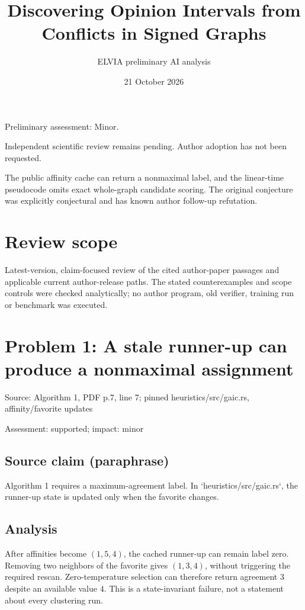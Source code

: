 \documentclass[11pt]{article}
\begin{document}
\title{Discovering Opinion Intervals from Conflicts in Signed Graphs}

\author{ELVIA preliminary AI analysis}\date{21 October 2026}\maketitle

Preliminary assessment: Minor.\par

Independent scientific review remains pending. Author adoption has not been requested.

The public affinity cache can return a nonmaximal label, and the linear-time pseudocode omits exact whole-graph candidate scoring. The original conjecture was explicitly conjectural and has known author follow-up refutation.

\section*{Review scope}

Latest-version, claim-focused review of the cited author-paper passages and applicable current author-release paths. The stated counterexamples and scope controls were checked analytically; no author program, old verifier, training run or benchmark was executed.

\section*{Problem 1: A stale runner-up can produce a nonmaximal assignment}

Source: Algorithm 1, PDF p.7, line 7; pinned heuristics/src/gaic.rs, affinity/favorite updates

Assessment: supported; impact: minor

\subsection*{Source claim (paraphrase)}

Algorithm 1 requires a maximum-agreement label. In `heuristics/src/gaic.rs`, the runner-up state is updated only when the favorite changes.

\subsection*{Analysis}

After affinities become \((1,5,4)\), the cached runner-up can remain label zero. Removing two neighbors of the favorite gives \((1,3,4)\), without triggering the required rescan. Zero-temperature selection can therefore return agreement \(3\) despite an available value \(4\). This is a state-invariant failure, not a statement about every clustering run.
\end{document}
